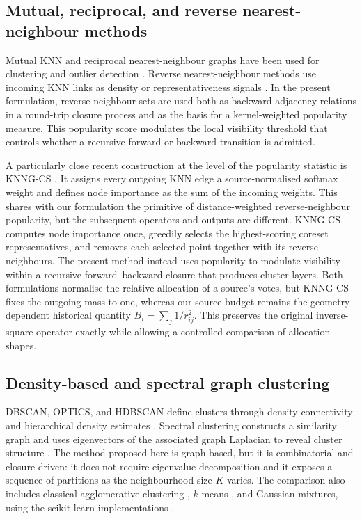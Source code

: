 \documentclass[pdflatex,sn-mathphys-num]{sn-jnl}
\begin{document}
\subsection{Mutual, reciprocal, and reverse nearest-neighbour methods}

Mutual KNN and reciprocal nearest-neighbour graphs have been used for clustering and outlier detection \citep{BritoChavezQuirozYukich1997,GowdaKrishna1978,SardanaBhatnagar2014}. Reverse nearest-neighbour methods use incoming KNN links as density or representativeness signals \citep{ChowdhuryAmorim2018}. In the present formulation, reverse-neighbour sets are used both as backward adjacency relations in a round-trip closure process and as the basis for a kernel-weighted popularity measure. This popularity score modulates the local visibility threshold that controls whether a recursive forward or backward transition is admitted.

A particularly close recent construction at the level of the popularity statistic is KNNG-CS \citep{LiuEtAl2026KNNGCS}. It assigns every outgoing KNN edge a source-normalised softmax weight and defines node importance as the sum of the incoming weights. This shares with our formulation the primitive of distance-weighted reverse-neighbour popularity, but the subsequent operators and outputs are different. KNNG-CS computes node importance once, greedily selects the highest-scoring coreset representatives, and removes each selected point together with its reverse neighbours. The present method instead uses popularity to modulate visibility within a recursive forward--backward closure that produces cluster layers. Both formulations normalise the relative allocation of a source's votes, but KNNG-CS fixes the outgoing mass to one, whereas our source budget remains the geometry-dependent historical quantity $B_i=\sum_j 1/r_{ij}^2$. This preserves the original inverse-square operator exactly while allowing a controlled comparison of allocation shapes.

\subsection{Density-based and spectral graph clustering}

DBSCAN, OPTICS, and HDBSCAN define clusters through density connectivity and hierarchical density estimates \citep{Ester1996DBSCAN,Ankerst1999OPTICS,Campello2013HDBSCAN,CampelloMoulaviZimekSander2015}. Spectral clustering constructs a similarity graph and uses eigenvectors of the associated graph Laplacian to reveal cluster structure \citep{NgJordanWeiss2002,VonLuxburg2007}. The method proposed here is graph-based, but it is combinatorial and closure-driven: it does not require eigenvalue decomposition and it exposes a sequence of partitions as the neighbourhood size $K$ varies.
The comparison also includes classical agglomerative clustering
\citep{MurtaghContreras2012}, $k$-means \citep{Lloyd1982,MacQueen1967}, and
Gaussian mixtures, using the scikit-learn implementations
\citep{PedregosaEtAl2011}.
\end{document}
